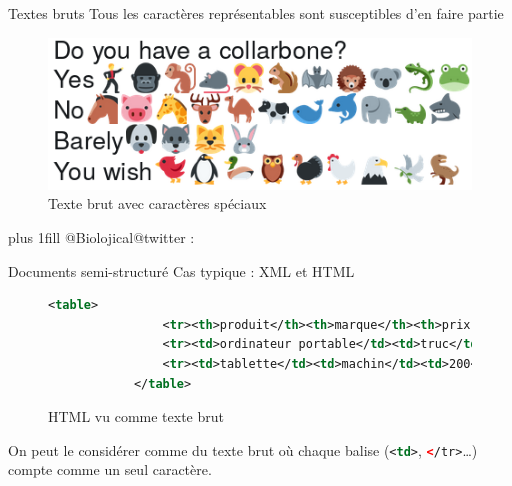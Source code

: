 \documentclass[hyperref={unicode}, xcolor={svgnames}]{beamer}
\begin{document}
\begin{frame}{Textes bruts}
    \alert{Tous} les caractères représentables sont susceptibles d'en faire partie
    \begin{figure}
        \includegraphics[width=\textwidth, height=0.8\textheight, keepaspectratio]{pics/raw_emoji.png}
        \caption{Texte brut avec caractères spéciaux}
    \end{figure}
    \vskip0pt plus 1fill
    {\tiny @Biolojical@twitter : }
\end{frame}

\begin{frame}[fragile=singleslide]{Documents semi-structuré}
    Cas typique : XML et HTML
    \begin{figure}
        \begin{lstlisting}[gobble=12, language=XML]
            <table>
                <tr><th>produit</th><th>marque</th><th>prix en euros</th></tr>
                <tr><td>ordinateur portable</td><td>truc</td><td>800</td></tr>
                <tr><td>tablette</td><td>machin</td><td>200</td></tr>
            </table>
        \end{lstlisting}
        \caption{HTML vu comme texte brut}
    \end{figure}
    On peut le considérer comme du texte brut où chaque balise (\lstinline[language=XML]{<td>}, \lstinline[language=XML]{</tr>}…) compte comme un seul caractère.
\end{frame}
\end{document}
